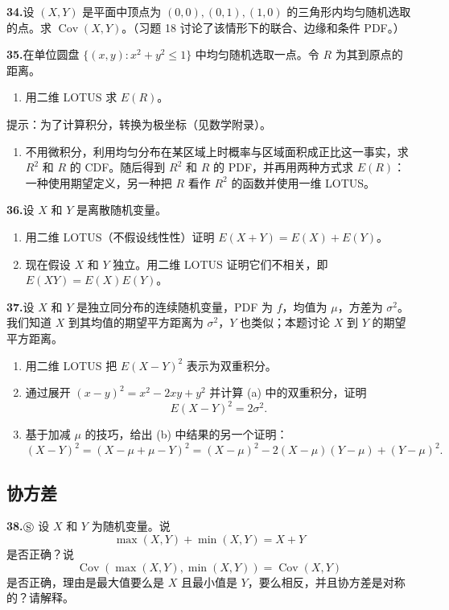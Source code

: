 \documentclass[UTF8, 12pt, fontset=fandol, oneside]{ctexart}
\begin{document}
\noindent\textbf{34.}\quad 设 $(X,Y)$ 是平面中顶点为 $(0,0),(0,1),(1,0)$ 的三角形内均匀随机选取的点。求 $\operatorname{Cov}(X,Y)$。（习题 18 讨论了该情形下的联合、边缘和条件 PDF。）

\noindent\textbf{35.}\quad 在单位圆盘 $\{(x,y):x^2+y^2\le 1\}$ 中均匀随机选取一点。令 $R$ 为其到原点的距离。
\begin{enumerate}
  \item[(a)] 用二维 LOTUS 求 $E(R)$。
\end{enumerate}
提示：为了计算积分，转换为极坐标（见数学附录）。
\begin{enumerate}
  \item[(b)] 不用微积分，利用均匀分布在某区域上时概率与区域面积成正比这一事实，求 $R^2$ 和 $R$ 的 CDF。随后得到 $R^2$ 和 $R$ 的 PDF，并再用两种方式求 $E(R)$：一种使用期望定义，另一种把 $R$ 看作 $R^2$ 的函数并使用一维 LOTUS。
\end{enumerate}

\noindent\textbf{36.}\quad 设 $X$ 和 $Y$ 是离散随机变量。
\begin{enumerate}
  \item[(a)] 用二维 LOTUS（不假设线性性）证明 $E(X+Y)=E(X)+E(Y)$。
  \item[(b)] 现在假设 $X$ 和 $Y$ 独立。用二维 LOTUS 证明它们不相关，即 $E(XY)=E(X)E(Y)$。
\end{enumerate}

\noindent\textbf{37.}\quad 设 $X$ 和 $Y$ 是独立同分布的连续随机变量，PDF 为 $f$，均值为 $\mu$，方差为 $\sigma^2$。我们知道 $X$ 到其均值的期望平方距离为 $\sigma^2$，$Y$ 也类似；本题讨论 $X$ 到 $Y$ 的期望平方距离。
\begin{enumerate}
  \item[(a)] 用二维 LOTUS 把 $E(X-Y)^2$ 表示为双重积分。
  \item[(b)] 通过展开 $(x-y)^2=x^2-2xy+y^2$ 并计算 (a) 中的双重积分，证明
  \[
    E(X-Y)^2=2\sigma^2.
  \]
  \item[(c)] 基于加减 $\mu$ 的技巧，给出 (b) 中结果的另一个证明：
  \[
    (X-Y)^2=(X-\mu+\mu-Y)^2=(X-\mu)^2-2(X-\mu)(Y-\mu)+(Y-\mu)^2.
  \]
\end{enumerate}

\subsection*{协方差}

\noindent\textbf{38.}\quad $\circledS$ 设 $X$ 和 $Y$ 为随机变量。说
\[
  \max(X,Y)+\min(X,Y)=X+Y
\]
是否正确？说
\[
  \operatorname{Cov}(\max(X,Y),\min(X,Y))=\operatorname{Cov}(X,Y)
\]
是否正确，理由是最大值要么是 $X$ 且最小值是 $Y$，要么相反，并且协方差是对称的？请解释。
\end{document}
